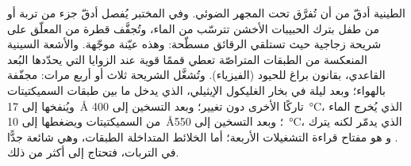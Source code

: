 \begin{inthelab}
 الطينية أدقّ من أن تُفرَّق تحت المجهر الضوئي. وفي المختبر يُفصل أدقّ جزء من تربة أو من طفل بترك الحبيبات الأخشن تترسّب من الماء، وتُجفَّف قطرة من المعلّق على شريحة زجاجية حيث تستلقي الرقائق مسطّحة: وهذه عيّنة موجّهة. والأشعة السينية المنعكسة من الطبقات المتراصّة تعطي قممًا قوية عند الزوايا التي يحدّدها البُعد القاعدي، بقانون براغ للحيود (الفيزياء). وتُشغَّل الشريحة ثلاث أو أربع مرات: مجفّفة بالهواء؛ وبعد ليلة في بخار الغليكول الإيثيلي، الذي يدخل ما بين طبقات السميكتيتات ويُنفخها إلى \SI{17}{\angstrom} تاركًا  الأخرى دون تغيير؛ وبعد التسخين إلى \SI{400}{\celsius}، الذي يُخرج الماء من السميكتيتات ويضغطها إلى \SI{10}{\angstrom}؛ وبعد التسخين إلى \SI{550}{\celsius}، الذي يدمّر  لكنه يترك  . و هو مفتاح قراءة التشغيلات الأربعة؛ أما الخلائط  المتداخلة الطبقات، وهي شائعة جدًّا في التربات، فتحتاج إلى أكثر من ذلك.
\end{inthelab}


